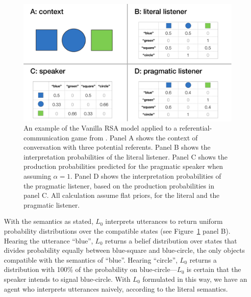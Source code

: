 \documentclass{sp}
\begin{document}
\begin{figure}[t]
\centering
\includegraphics[width=\textwidth]{pics/RefGame-example.pdf}
\caption{An example of the Vanilla RSA model applied to a referential-communication game from \cite{frankgoodman2012}. Panel A shows the context of conversation with three potential referents. Panel B shows the interpretation probabilities of the literal listener. Panel C shows the production probabilities predicted for the pragmatic speaker when assuming $\alpha = 1$. Panel D shows the interpretation probabilities of the pragmatic listener, based on the production probabilities in panel C. All calculation assume flat priors, for the literal and the pragmatic listener.}
\label{ref-game}
\end{figure}

With the semantics as stated, $L_0$ interprets utterances to return uniform probability distributions over the compatible states (see Figure~\ref{ref-game} panel B). Hearing the utterance ``blue'', $L_0$ returns a belief distribution over states that divides probability equally between blue-square and blue-circle, the only objects compatible with the semantics of ``blue''. Hearing ``circle'', $L_0$ returns a distribution with 100\% of the probability on blue-circle---$L_0$ is certain that the speaker intends to signal blue-circle. With $L_0$ formulated in this way, we have an agent who interprets utterances naively, according to the literal semantics.
\end{document}
